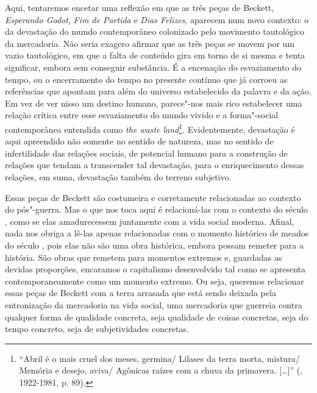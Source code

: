 Aqui, tentaremos encetar uma reflexão em que as três peças de Beckett,
\emph{Esperando Godot}, \emph{Fim de Partida} e \emph{Dias Felizes},
aparecem num novo contexto: o da devastação do mundo contemporâneo
colonizado pelo movimento tautológico da mercadoria. Não seria exagero
afirmar que as três peças se movem por um vazio tautológico, em que a
falta de conteúdo gira em torno de si mesma e tenta significar, embora
sem conseguir substância. É a encenação do esvaziamento do tempo, ou o
encerramento do tempo no presente contínuo que já corroeu as referências
que apontam para além do universo estabelecido da palavra e da ação. Em
vez de ver nisso um destino humano, parece"-nos mais rico estabelecer uma
relação crítica entre esse esvaziamento do mundo vivido e a forma"-social
contemporânea entendida como \emph{the waste land}\footnote{``Abril é o
  mais cruel dos meses, germina/ Lilases da terra morta, mistura/
  Memória e desejo, aviva/ Agônicas raízes com a chuva da primavera.
  [\ldots{}]'' (, 1922-1981, p. 89).}. Evidentemente,
devastação é aqui apreendido não somente no sentido de natureza, mas no
sentido de infertilidade das relações sociais, de potencial humano para
a construção de relações que tendam a transcender tal devastação, para o
enriquecimento dessas relações, em suma, devastação também do terreno
subjetivo.

Essas peças de Beckett são costumeira e corretamente relacionadas ao
contexto do pós"-guerra. Mas o que nos toca aqui é relacioná-las com o
contexto do século , como se elas amadurecessem juntamente com a vida
social moderna. Afinal, nada nos obriga a lê-las apenas relacionadas com
o momento histórico de meados do século , pois elas não são uma obra
histórica, embora possam remeter para a história. São obras que remetem
para momentos extremos e, guardadas as devidas proporções, encaramos o
capitalismo desenvolvido tal como se apresenta contemporaneamente como
um momento extremo. Ou seja, queremos relacionar essas peças de Beckett
com a terra arrasada que está sendo deixada pela entronização da
mercadoria na vida social, uma mercadoria que guerreia contra qualquer
forma de qualidade concreta, seja qualidade de coisas concretas, seja do
tempo concreto, seja de subjetividades concretas.

